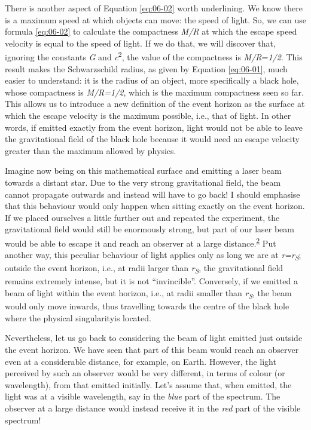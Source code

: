 There is another aspect of Equation \eqref{eq:06-02} worth underlining. We know there is a maximum
speed at which objects can move: the speed of light. So, we can use formula \eqref{eq:06-02} to
calculate the compactness \emph{M/R} at which the escape speed velocity is equal to the
speed of light. If we do that, we will discover that, ignoring the constants \emph{G}
and \emph{c}\textsuperscript{2}, the value of the compactness is
\emph{M/R}=\emph{1/2}. This result makes the Schwarzschild radius, as given by Equation
\eqref{eq:06-01}, much easier to understand: it is the radius of an object, more specifically a
black hole, whose compactness is \emph{M/R=1/2}, which is the maximum
compactness seen so far. This allows us to introduce a new definition
of the event horizon as the surface at which the
escape velocity is the maximum possible, i.e., that of light. In other
words, if emitted exactly from the event horizon, light would not be able to leave the
gravitational field of the black hole because it would need an escape velocity greater
than the maximum allowed by physics.

Imagine now being on this mathematical surface and emitting a laser beam towards a
distant star. Due to the very strong gravitational field, the beam cannot propagate
outwards and instead will have to go back! I should emphasise that this behaviour would
only happen when sitting exactly on the event horizon. If we placed ourselves a little
further out and repeated the experiment, the gravitational field would still be
enormously strong, but part of our laser beam would be able to escape it and reach an
observer at a large distance.\textsuperscript{\hyperlink{note:06-02}{2}} Put another way, this peculiar behaviour
of light applies only as long we are at \emph{r=r\textsubscript{S}}; outside the event
horizon, i.e., at radii larger than \emph{r\textsubscript{S}}, the gravitational field
remains extremely intense, but it is not ``invincible''. Conversely, if we emitted a
beam of light within the event horizon, i.e., at radii smaller than
\emph{r\textsubscript{S}}, the beam would only move inwards, thus travelling towards the
centre of the black hole where the physical singularityis located.

Nevertheless, let us go back to considering the beam of light emitted just outside the
event horizon. We have seen that part of this beam would reach an observer even at a
considerable distance, for example, on Earth. However, the light perceived by such an
observer would be very different, in terms of colour (or wavelength), from that emitted
initially. Let's assume that, when emitted, the light was at a visible wavelength, say
in the \emph{blue} part of the spectrum. The observer at a large
distance would instead receive it in the \emph{red} part of the visible spectrum!

